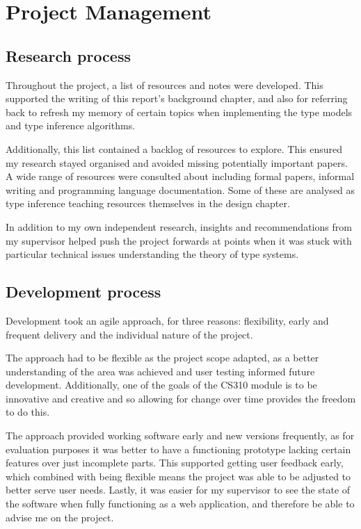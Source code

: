 \documentclass[a4paper,fleqn,twoside,12pt]{report}
\begin{document}
\chapter{Project Management}\label{id:h.3j8xp631ygy}
\section{Research process}\label{id:h.ew85fk610kqt}
Throughout the project, a list of resources and notes were developed. This supported the writing of this report’s background chapter, and also for referring back to refresh my memory of certain topics when implementing the type models and type inference algorithms.

Additionally, this list contained a backlog of resources to explore. This ensured my research stayed organised and avoided missing potentially important papers. A wide range of resources were consulted about including formal papers, informal writing and programming language documentation. Some of these are analysed as type inference teaching resources themselves in the design chapter.

In addition to my own independent research, insights and recommendations from my supervisor helped push the project forwards at points when it was stuck with particular technical issues understanding the theory of type systems.
\section{Development process}\label{id:h.3r2hzi490wg9}
Development took an agile approach, for three reasons: flexibility, early and frequent delivery and the individual nature of the project.

The approach had to be flexible as the project scope adapted, as a better understanding of the area was achieved and user testing informed future development. Additionally, one of the goals of the CS310 module is to be innovative and creative and so allowing for change over time provides the freedom to do this.

The approach provided working software early and new versions frequently, as for evaluation purposes it was better to have a functioning prototype lacking certain features over just incomplete parts. This supported getting user feedback early, which combined with being flexible means the project was able to be adjusted to better serve user needs. Lastly, it was easier for my supervisor to see the state of the software when fully functioning as a web application, and therefore be able to advise me on the project.
\end{document}

